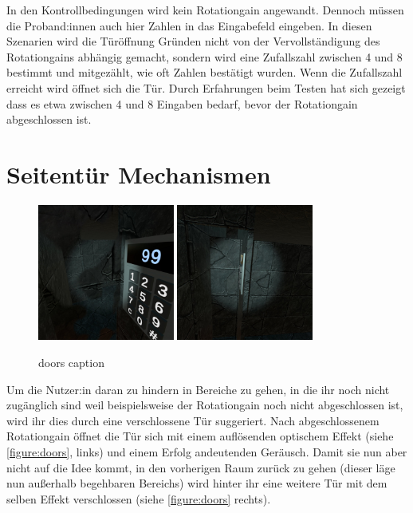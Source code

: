 In den Kontrollbedingungen wird kein Rotationgain angewandt. Dennoch müssen die Proband:innen auch hier Zahlen in das Eingabefeld eingeben. In diesen Szenarien wird die Türöffnung Gründen nicht von der Vervollständigung des Rotationgains abhängig gemacht, sondern wird eine Zufallszahl zwischen 4 und 8 bestimmt und mitgezählt, wie oft Zahlen bestätigt wurden. Wenn die Zufallszahl erreicht wird öffnet sich die Tür. Durch Erfahrungen beim Testen hat sich gezeigt dass es etwa zwischen 4 und 8 Eingaben bedarf, bevor der Rotationgain abgeschlossen ist.

\section{Seitentür Mechanismen}
\begin{figure}[!h]
    \centering
    \includegraphics[width=0.4\textwidth]{vrscreenshots/dissolve.jpg}
    \includegraphics[width=0.4\textwidth]{vrscreenshots/reverseddoor.jpg}
    \caption{doors caption}\label{figure:doors}
\end{figure}

Um die Nutzer:in daran zu hindern in Bereiche zu gehen, in die ihr noch nicht zugänglich sind weil beispielsweise der Rotationgain noch nicht abgeschlossen ist, wird ihr dies durch eine verschlossene Tür suggeriert. Nach abgeschlossenem Rotationgain öffnet die Tür sich mit einem auflösenden optischem Effekt (siehe \autoref{figure:doors}, links) und einem Erfolg andeutenden Geräusch. Damit sie nun aber nicht auf die Idee kommt, in den vorherigen Raum zurück zu gehen (dieser läge nun außerhalb begehbaren Bereichs) wird hinter ihr eine weitere Tür mit dem selben Effekt verschlossen (siehe \autoref{figure:doors} rechts).

